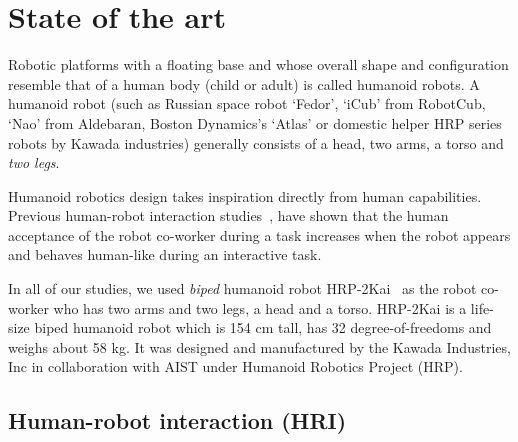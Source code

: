 
{\color{blue}\chapter{State of the art}\label{sota}}


Robotic platforms with a floating base and whose overall shape and configuration resemble that of a human body (child or adult) is called humanoid robots. A humanoid robot (such as Russian space robot `Fedor', `iCub' from RobotCub, `Nao' from Aldebaran, Boston Dynamics's `Atlas' or domestic helper HRP series robots by Kawada industries) generally consists of a head, two arms, a torso and \textit{two legs}.

Humanoid robotics design takes inspiration directly from human capabilities. Previous human-robot interaction studies~\cite{huber2008human, strabala2013toward, shibata1995experimental, Chaminade:JPP:2009}, have shown that the human acceptance of the robot co-worker during a task increases when the robot appears and behaves human-like during an interactive task. 

In all of our studies, we used \textit{biped} humanoid robot HRP-2Kai~\cite{Kaneko:RAS_ICHR:2015} as the robot co-worker who has two arms and two legs, a head and a torso. HRP-2Kai is a life-size biped humanoid robot which is 154 cm tall, has 32 degree-of-freedoms and weighs about 58 kg. It was designed and manufactured by the Kawada Industries, Inc in collaboration with AIST under Humanoid Robotics Project (HRP).


\section{Human-robot interaction (HRI)}

